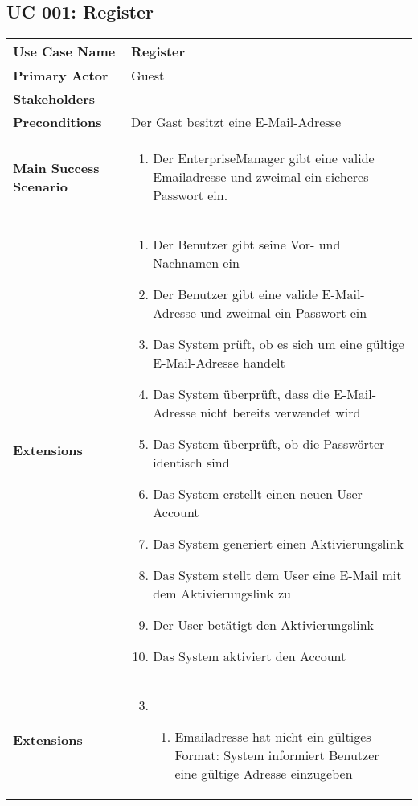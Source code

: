 \subsection{UC 001: Register}
\label{uc:001-register}

\begin{tabular}{|l|p{}|}
\hline
\textbf{Use Case Name} 	&	Register	\\ \hline
\textbf{Primary Actor} 	&	Guest	\\ \hline
\textbf{Stakeholders}	&	-	\\ \hline
\textbf{Preconditions}	&	Der Gast besitzt eine E-Mail-Adresse	\\ \hline
\textbf{Main Success Scenario}	& 	
\begin{enumerate}
	\item Der EnterpriseManager gibt eine valide Emailadresse und zweimal ein sicheres Passwort ein.
\end{enumerate}
\\ \hline
\textbf{Extensions}	&
\begin{enumerate}
	\item Der Benutzer gibt seine Vor- und Nachnamen ein
	\item Der Benutzer gibt eine valide E-Mail-Adresse und zweimal ein Passwort ein
	\item Das System prüft, ob es sich um eine gültige E-Mail-Adresse handelt
	\item Das System überprüft, dass die E-Mail-Adresse nicht bereits verwendet wird
	\item Das System überprüft, ob die Passwörter identisch sind
	\item Das System erstellt einen neuen User-Account
	\item Das System generiert einen Aktivierungslink 
	\item Das System stellt dem User eine E-Mail mit dem Aktivierungslink zu
	\item Der User betätigt den Aktivierungslink 
	\item Das System aktiviert den Account 
\end{enumerate}
\\ \hline
\textbf{Extensions}	& 	
\begin{enumerate}
\setcounter{enumi}{2}
    \item
    \begin{enumerate}
    \item Emailadresse hat nicht ein gültiges Format: System informiert Benutzer eine gültige Adresse einzugeben

\end{enumerate}
\end{enumerate}
\end{tabular}
